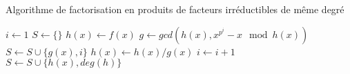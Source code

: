 \begin{algorithm}
  \caption{Algorithme de factorisation en produits de facteurs
        irr\'eductibles de même degr\'e }
  \begin{algorithmic}[1]
    \Statex
      \State $i \gets 1$
      \State $S \gets \{\}$
      \State $h(x) \gets f(x)$
        \State $g \gets gcd(h(x), x^{p^i} - x \mod h(x))$
          \State $S \gets S \cup \{g(x), i\}$
        \EndIf
        \State $h(x) \gets h(x)/g(x)$
        \State $i \gets i+1$
      \EndWhile
        \State $S \gets S \cup \{h(x), deg(h)\}$
      \EndIf
      \State {}
    \EndFunction
  \end{algorithmic}
\end{algorithm}
